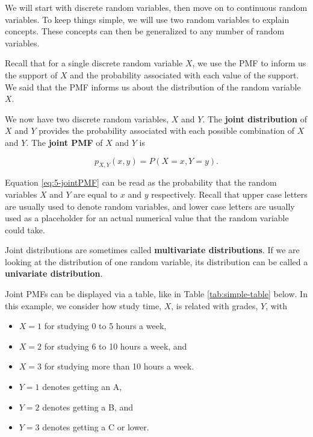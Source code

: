 \documentclass[
]{book}
\providecommand{\tightlist}{%
  \setlength{\itemsep}{0pt}\setlength{\parskip}{0pt}}
\begin{document}
We will start with discrete random variables, then move on to continuous random variables. To keep things simple, we will use two random variables to explain concepts. These concepts can then be generalized to any number of random variables.

Recall that for a single discrete random variable \(X\), we use the PMF to inform us the support of \(X\) and the probability associated with each value of the support. We said that the PMF informs us about the distribution of the random variable \(X\).

We now have two discrete random variables, \(X\) and \(Y\). The \textbf{joint distribution} of \(X\) and \(Y\) provides the probability associated with each possible combination of \(X\) and \(Y\). The \textbf{joint PMF} of \(X\) and \(Y\) is

\begin{equation} 
p_{X,Y}(x,y) = P(X=x, Y=y).
\label{eq:5-jointPMF}
\end{equation}

Equation \eqref{eq:5-jointPMF} can be read as the probability that the random variables \(X\) and \(Y\) are equal to \(x\) and \(y\) respectively. Recall that upper case letters are usually used to denote random variables, and lower case letters are usually used as a placeholder for an actual numerical value that the random variable could take.

Joint distributions are sometimes called \textbf{multivariate distributions}. If we are looking at the distribution of one random variable, its distribution can be called a \textbf{univariate distribution}.

Joint PMFs can be displayed via a table, like in Table \ref{tab:simple-table} below. In this example, we consider how study time, \(X\), is related with grades, \(Y\), with

\begin{itemize}
\tightlist
\item
  \(X=1\) for studying 0 to 5 hours a week,
\item
  \(X=2\) for studying 6 to 10 hours a week, and
\item
  \(X=3\) for studying more than 10 hours a week.
\item
  \(Y=1\) denotes getting an A,
\item
  \(Y=2\) denotes getting a B, and
\item
  \(Y=3\) denotes getting a C or lower.
\end{itemize}
\end{document}
